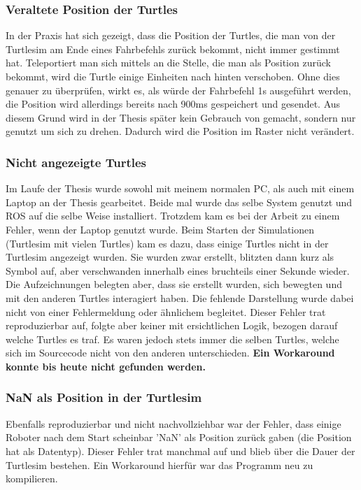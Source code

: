 \subsubsection*{Veraltete Position der Turtles}
In der Praxis hat sich gezeigt, dass die Position der Turtles, die man von der Turtlesim am Ende eines Fahrbefehls zurück bekommt, nicht immer gestimmt hat. Teleportiert man sich mittels  an die Stelle, die man als Position zurück bekommt, wird die Turtle einige Einheiten nach hinten verschoben. Ohne dies genauer zu überprüfen, wirkt es, als würde der Fahrbefehl 1s ausgeführt werden, die Position wird allerdings bereits nach 900ms gespeichert und gesendet.
Aus diesem Grund wird in der Thesis später kein Gebrauch von  gemacht, sondern nur  genutzt um sich zu drehen. Dadurch wird die Position im Raster nicht verändert.

\subsubsection*{Nicht angezeigte Turtles}
Im Laufe der Thesis wurde sowohl mit meinem normalen PC, als auch mit einem Laptop an der Thesis gearbeitet. Beide mal wurde das selbe System genutzt und \ac{ROS} auf die selbe Weise installiert. Trotzdem kam es bei der Arbeit zu einem Fehler, wenn der Laptop genutzt wurde. Beim Starten der Simulationen (Turtlesim mit vielen Turtles) kam es dazu, dass einige Turtles nicht in der Turtlesim angezeigt wurden. Sie wurden zwar erstellt, blitzten dann kurz als Symbol auf, aber verschwanden innerhalb eines bruchteils einer Sekunde wieder. Die Aufzeichnungen belegten aber, dass sie erstellt wurden, sich bewegten und mit den anderen Turtles interagiert haben. Die fehlende Darstellung wurde dabei nicht von einer Fehlermeldung oder ähnlichem begleitet. Dieser Fehler trat reproduzierbar auf, folgte aber keiner mit ersichtlichen Logik, bezogen darauf welche Turtles es traf. Es waren jedoch stets immer die selben Turtles, welche sich im Sourcecode nicht von den anderen unterschieden. \textbf{Ein Workaround konnte bis heute nicht gefunden werden.}

\subsubsection*{NaN als Position in der Turtlesim}
Ebenfalls reproduzierbar und nicht nachvollziehbar war der Fehler, dass einige Roboter nach dem Start scheinbar 'NaN' als Position zurück gaben (die Position hat  als Datentyp). Dieser Fehler trat manchmal auf und blieb über die Dauer der Turtlesim bestehen. Ein Workaround hierfür war das Programm neu zu kompilieren.

